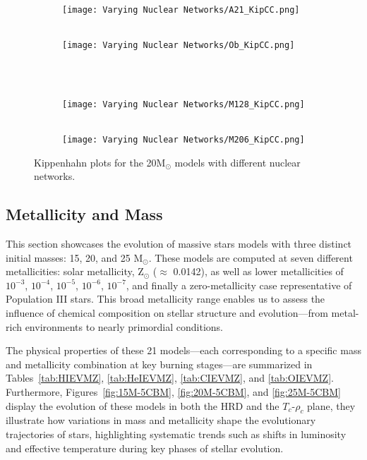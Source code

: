 \begin{figure}[h!]
    \centering
    \begin{subfigure}{0.49\textwidth}
        \centering
         \\
        \texttt{[image: Varying Nuclear Networks/A21\_KipCC.png]}
    \end{subfigure}
    \begin{subfigure}{0.49\textwidth}
        \centering
         \\
        \texttt{[image: Varying Nuclear Networks/Ob\_KipCC.png]}
    \end{subfigure}
    \\[0.5em]
    \begin{subfigure}{0.49\textwidth}
        \centering
         \\
        \texttt{[image: Varying Nuclear Networks/M128\_KipCC.png]}
    \end{subfigure}
    \begin{subfigure}{0.49\textwidth}
        \centering
         \\
        \texttt{[image: Varying Nuclear Networks/M206\_KipCC.png]}
    \end{subfigure}
    \caption{Kippenhahn plots for the 20M\(_\odot \) models with different nuclear networks.}
    \label{fig:NucKips}
\end{figure}

\clearpage
\subsection{Metallicity and Mass}
This section showcases the evolution of massive stars models with three distinct initial masses: 15, 20, and 25 M$_\odot$. These models are computed at seven different metallicities: solar metallicity, Z$_\odot$ ($\approx$ 0.0142), as well as lower metallicities of $10^{-3}$, $10^{-4}$, $10^{-5}$, $10^{-6}$, $10^{-7}$, and finally a zero-metallicity case representative of Population III stars. This broad metallicity range enables us to assess the influence of chemical composition on stellar structure and evolution—from metal-rich environments to nearly primordial conditions.

\vspace{1em}
\noindent
The physical properties of these 21 models—each corresponding to a specific mass and metallicity combination at key burning stages—are summarized in Tables~\ref{tab:HIEVMZ}, \ref{tab:HeIEVMZ}, \ref{tab:CIEVMZ}, and \ref{tab:OIEVMZ}. Furthermore, Figures~\ref{fig:15M-5CBM}, \ref{fig:20M-5CBM}, and \ref{fig:25M-5CBM} display the evolution of these models in both the HRD and the \(T_c\)-\(\rho_c\) plane, they illustrate how variations in mass and metallicity shape the evolutionary trajectories of stars, highlighting systematic trends such as shifts in luminosity and effective temperature during key phases of stellar evolution.

